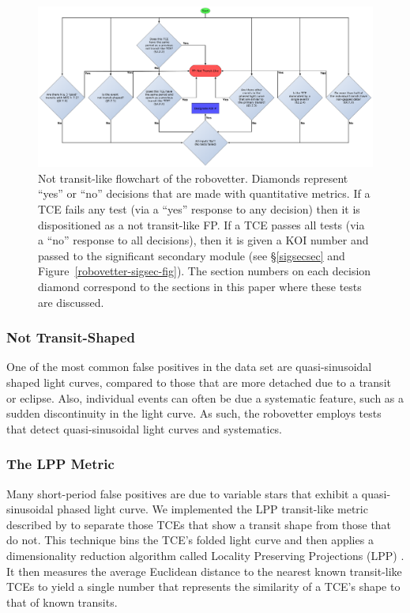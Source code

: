 \begin{figure}[ht]
\centering
\includegraphics[width=\linewidth]{RoboVetter-Diagram-V4-TransitLike.pdf}
\caption{Not transit-like flowchart of the robovetter. Diamonds represent ``yes'' or ``no'' decisions that are made with quantitative metrics. If a TCE fails any test (via a ``yes'' response to any decision) then it is dispositioned as a not transit-like FP. If a TCE passes all tests (via a ``no'' response to all decisions), then it is given a KOI number and passed to the significant secondary module (see \S\ref{sigsecsec} and Figure~\ref{robovetter-sigsec-fig}). The section numbers on each decision diamond correspond to the sections in this paper where these tests are discussed.}
\label{robovetter-transitlike-fig}
\end{figure}


\subsubsection{Not Transit-Shaped}

One of the most common false positives in the data set are quasi-sinusoidal shaped light curves, compared to those that are more detached due to a transit or eclipse. Also, individual events can often be due a systematic feature, such as a sudden discontinuity in the light curve. As such, the robovetter employs tests that detect quasi-sinusoidal light curves and systematics.


\subsubsection{The LPP Metric}
\label{s:lpp}

Many short-period false positives are due to variable stars that exhibit a quasi-sinusoidal phased light curve. We implemented the LPP transit-like metric described by \citet{Thompson2015b} to separate those TCEs that show a transit shape from those that do not. This technique bins the TCE's folded light curve and then applies a dimensionality reduction algorithm called Locality Preserving Projections (LPP) \citep{He2004}.  It then measures the average Euclidean distance to the nearest known transit-like TCEs to yield a single number that represents the similarity of a TCE's shape to that of known transits. 

